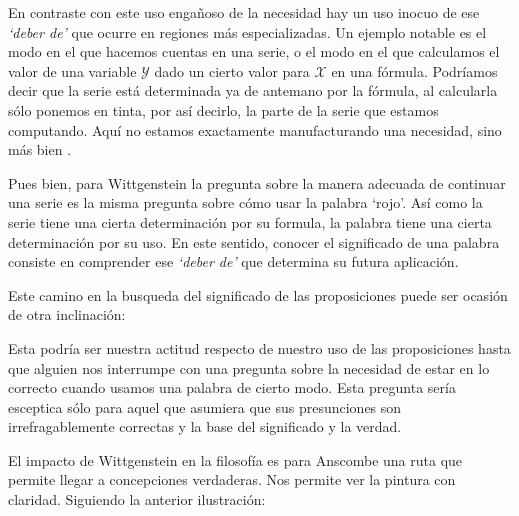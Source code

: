 En contraste con este uso engañoso de la necesidad hay un uso inocuo de ese
\emph{`deber de'} que ocurre en regiones más especializadas. Un ejemplo
notable es el modo en el que hacemos cuentas en una serie, o el modo en el que
calculamos el valor de una variable $\mathcal{Y}$ dado un cierto valor para
$\mathcal{X}$ en una fórmula. Podríamos decir que la serie está determinada ya
de antemano por la fórmula, al calcularla sólo ponemos en tinta, por así
decirlo, la parte de la serie que estamos computando. Aquí no estamos
exactamente manufacturando una necesidad, sino más bien
.

Pues bien, para Wittgenstein la pregunta sobre la manera adecuada de continuar
una serie es la misma pregunta sobre cómo usar la palabra `rojo'. Así como la
serie tiene una cierta determinación por su formula, la palabra tiene una cierta
determinación por su uso. En este sentido, conocer el significado de una palabra
consiste en comprender ese \emph{`deber de'} que determina su futura aplicación.

Este camino en la busqueda del significado de las proposiciones puede ser
ocasión de otra inclinación:

Esta podría ser nuestra actitud respecto de nuestro uso de las proposiciones
hasta que alguien nos interrumpe con una pregunta sobre la necesidad de estar en
lo correcto cuando usamos una palabra de cierto modo. Esta pregunta sería
esceptica sólo para aquel que asumiera que sus presunciones son
irrefragablemente correctas y la base del significado y la
verdad.\autocite[cfr.~][p.~186]{twocuts}

El impacto de Wittgenstein en la filosofía es para Anscombe una ruta que permite
llegar a concepciones verdaderas. Nos permite ver la pintura con claridad.
Siguiendo la anterior ilustración:



